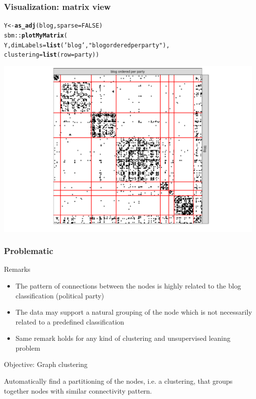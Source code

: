 \documentclass{beamer}\usepackage[]{graphicx}\usepackage[]{color}
\makeatletter
\newcommand{\hlnum}[1]{\textcolor[rgb]{0.686,0.059,0.569}{#1}}%
\newcommand{\hlstr}[1]{\textcolor[rgb]{0.192,0.494,0.8}{#1}}%
\newcommand{\hlopt}[1]{\textcolor[rgb]{0,0,0}{#1}}%
\newcommand{\hlstd}[1]{\textcolor[rgb]{0.345,0.345,0.345}{#1}}%
\newcommand{\hlkwb}[1]{\textcolor[rgb]{0.69,0.353,0.396}{#1}}%
\newcommand{\hlkwc}[1]{\textcolor[rgb]{0.333,0.667,0.333}{#1}}%
\newcommand{\hlkwd}[1]{\textcolor[rgb]{0.737,0.353,0.396}{\textbf{#1}}}%
\newenvironment{kframe}{%
 \def\at@end@of@kframe{}%
 \ifinner\ifhmode%
  \def\at@end@of@kframe{\end{minipage}}%
  \begin{minipage}{\columnwidth}%
 \fi\fi%
 \def\FrameCommand##1{\hskip\@totalleftmargin \hskip-\fboxsep
 \colorbox{shadecolor}{##1}\hskip-\fboxsep
     \hskip-\linewidth \hskip-\@totalleftmargin \hskip\columnwidth}%
 \MakeFramed {\advance\hsize-\width
   \@totalleftmargin\z@ \linewidth\hsize
   \@setminipage}}%
 {\par\unskip\endMakeFramed%
 \at@end@of@kframe}
\newenvironment{knitrout}{}{} %
\makeatother
\begin{document}
\begin{frame}[fragile]
  \frametitle{Visualization: matrix view}

\begin{knitrout}\scriptsize
{}\color{fgcolor}\begin{kframe}
\begin{alltt}
\hlstd{Y}  \hlkwb{<-} \hlkwd{as_adj}\hlstd{(blog,} \hlkwc{sparse} \hlstd{=} \hlnum{FALSE}\hlstd{)}
\hlstd{sbm}\hlopt{::}\hlkwd{plotMyMatrix}\hlstd{(}
  \hlstd{Y,} \hlkwc{dimLabels} \hlstd{=} \hlkwd{list}\hlstd{(}\hlstr{'blog'}\hlstd{,} \hlstr{"blog ordered per party"}\hlstd{),}
  \hlkwc{clustering} \hlstd{=} \hlkwd{list}\hlstd{(}\hlkwc{row} \hlstd{= party))}
\end{alltt}
\end{kframe}
\includegraphics[width=.8\textwidth]{figures/unnamed-chunk-1-1} 
\end{knitrout}

\end{frame}

\begin{frame}
  \frametitle{Problematic}

\begin{block}{Remarks}  
  
  \begin{itemize}
  
  \item  The pattern of connections between the nodes is highly related to the blog classification (political party)
  
  \item The data may support a natural grouping of the node which is not necessarily related to a predefined classification
  
  \item Same remark holds for any kind of clustering and unsupervised leaning problem

  \end{itemize}
\end{block}

  \vfill
  
\begin{block}{Objective: \alert{Graph clustering}}

  Automatically find a \alert{partitioning} of the nodes, i.e. a clustering, that groups together nodes with similar connectivity pattern.

\end{block}

\end{frame}
\end{document}
